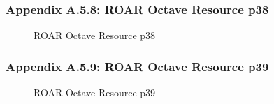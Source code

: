 \documentclass{article}[11pt]
\begin{document}
\subsubsection{Appendix A.5.8: ROAR Octave Resource p38}
\begin{figure}[h]
\begin{center}
\end{center}
\caption{ROAR Octave Resource p38}
\label{fig:roar-octave-resource-p38}
\end{figure}
\newline
\subsubsection{Appendix A.5.9: ROAR Octave Resource p39}
\begin{figure}[h]
\begin{center}
\end{center}
\caption{ROAR Octave Resource p39}
\label{fig:roar-octave-resource-p39}
\end{figure}
\newline
\end{document}
